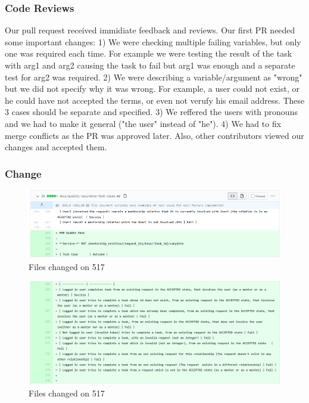 \documentclass{article}
\begin{document}
\subsubsection{Code Reviews}
\hspace{0.5cm}Our pull request received immidiate feedback and reviews. Our first PR needed some important changes:
1) We were checking multiple failing variables, but only one was required each time. For example we were testing the result of the task with arg1 and arg2 causing the task to fail but arg1 was enough and a separate test for arg2 was required. 
2) We were describing a variable/argument as "wrong" but we did not specify why it was wrong. For example, a user could not exist, or he could have not accepted the terms, or even not verufy his email address. These 3 cases should be separate and specified.
3) We reffered the users with pronouns and we had to make it general ("the user" instead of "he").
4) We had to fix merge conflicts as the PR was approved later.
 Also, other contributors viewed our changes and accepted them. 
\subsubsection{Change}
\begin{figure}[tph!]
\centerline{\includegraphics[totalheight=7cm, width=16cm]{517Changes_1.png}}
    \caption{Files changed on 517}
    \label{fig:verticalcell}
\end{figure}
\begin{figure}[tph!]
\centerline{\includegraphics[totalheight=13cm, width=19cm]{517Changes_2.png}}
    \caption{Files changed on 517}
    \label{fig:verticalcell}
\end{figure}
\vfill
\clearpage
\end{document}
